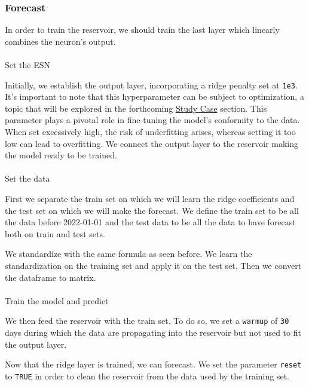 \documentclass[
  11pt,
  a4paper,
]{article}
\makeatletter
\let\oldparagraph\paragraph
\renewcommand{\paragraph}{
    \@ifstar
      \xxxParagraphStar
      \xxxParagraphNoStar
  }
\newcommand{\xxxParagraphStar}[1]{\oldparagraph*{#1}\mbox{}}
\newcommand{\xxxParagraphNoStar}[1]{\oldparagraph{#1}\mbox{}}
\theoremstyle{plain}
\theoremstyle{remark}
\makeatother
\begin{document}
\subsubsection{Forecast}\label{forecast}

In order to train the reservoir, we should train the last layer which
linearly combines the neuron's output.

\paragraph{Set the ESN}\label{set-the-esn}

Initially, we establish the output layer, incorporating a ridge penalty
set at \texttt{1e3}. It's important to note that this hyperparameter can
be subject to optimization, a topic that will be explored in the
forthcoming \hyperref[studycase]{Study Case} section. This parameter
plays a pivotal role in fine-tuning the model's conformity to the data.
When set excessively high, the risk of underfitting arises, whereas
setting it too low can lead to overfitting. We connect the output layer
to the reservoir making the model ready to be trained.

\paragraph{Set the data}\label{set-the-data}

First we separate the train set on which we will learn the ridge
coefficients and the test set on which we will make the forecast. We
define the train set to be all the data before 2022-01-01 and the test
data to be all the data to have forecast both on train and test sets.

We standardize with the same formula as seen before. We learn the
standardization on the training set and apply it on the test set. Then
we convert the dataframe to matrix.

\paragraph{Train the model and
predict}\label{train-the-model-and-predict}

We then feed the reservoir with the train set. To do so, we set a
\texttt{warmup} of \texttt{30} days during which the data are
propagating into the reservoir but not used to fit the output layer.

Now that the ridge layer is trained, we can forecast. We set the
parameter \texttt{reset} to \texttt{TRUE} in order to clean the
reservoir from the data used by the training set.
\end{document}
